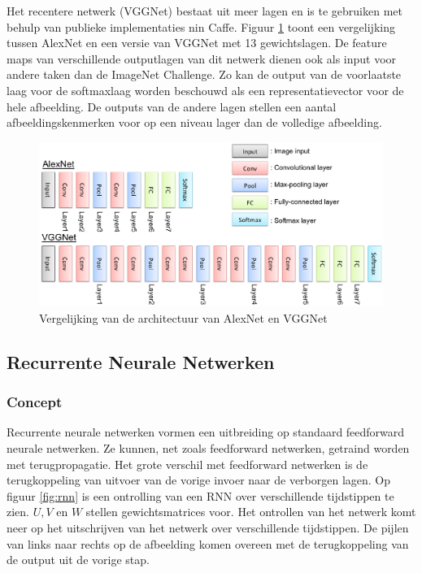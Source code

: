Het recentere netwerk (VGGNet\cite{Arge2015}) bestaat uit meer lagen en is te gebruiken met behulp van publieke implementaties nin Caffe\cite{Jia2014}.
Figuur \ref{fig:alexvgg} toont een vergelijking tussen AlexNet en een versie van VGGNet met 13 gewichtslagen. De feature maps van verschillende outputlagen van dit netwerk dienen ook als input voor andere taken dan de ImageNet Challenge. Zo kan de output van de voorlaatste laag voor de softmaxlaag worden beschouwd als een representatievector voor de hele afbeelding. De outputs van de andere lagen stellen een aantal afbeeldingskenmerken voor op een niveau lager dan de volledige afbeelding.

\begin{figure}[tb]
	\centering
	\includegraphics[width=\linewidth]{Images/alex_vgg.eps}
	\caption{Vergelijking van de architectuur van AlexNet en VGGNet}
	\label{fig:alexvgg}
\end{figure}

\subsection{Recurrente Neurale Netwerken}
\subsubsection{Concept}
Recurrente neurale netwerken vormen een uitbreiding op standaard feedforward neurale netwerken. Ze kunnen, net zoals feedforward netwerken, getraind worden met terugpropagatie. Het grote verschil met feedforward netwerken is de terugkoppeling van uitvoer van de vorige invoer naar de verborgen lagen. Op figuur \ref{fig:rnn} is een ontrolling van een RNN over verschillende tijdstippen te zien. $U,V$ en $W$ stellen gewichtsmatrices voor. Het ontrollen van het netwerk komt neer op het uitschrijven van het netwerk over verschillende tijdstippen. De pijlen van links naar rechts op de afbeelding komen overeen met de terugkoppeling van de output uit de vorige stap.

